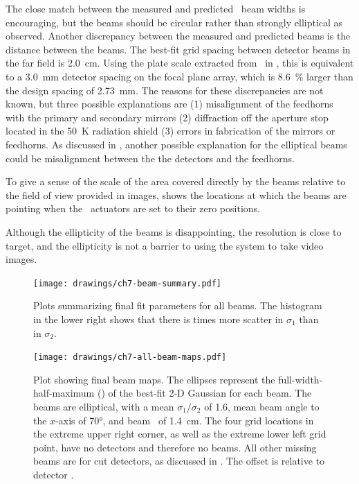 The close match between the measured and predicted \FWHM\ beam widths is encouraging, but the beams should be circular rather than strongly elliptical as observed.
Another discrepancy between the measured and predicted beams is the distance between the beams.
The best-fit grid spacing between detector beams in the far field is \SI{2.0}{\cm}.
Using the plate scale extracted from \ZEMAX\ in , this is equivalent to a \SI{3.0}{\mm} detector spacing on the focal plane array, which is \SI{8.6}{\percent} larger than the design spacing of \SI{2.73}{\mm}.
The reasons for these discrepancies are not known, but three possible explanations are (1) misalignment of the feedhorns with the primary and secondary mirrors (2) diffraction off the aperture stop located in the \SI{50}{\kelvin} radiation shield (3) errors in fabrication of the mirrors or feedhorns.
As discussed in , another possible explanation for the elliptical beams could be misalignment between the the detectors and the feedhorns.

To give a sense of the scale of the area covered directly by the beams relative to the field of view provided in images,  shows the locations at which the beams are pointing when the \BOSE\ actuators are set to their zero positions.

Although the ellipticity of the beams is disappointing, the resolution is close to target, and the ellipticity is not a barrier to using the system to take video images.

\begin{figure}
\centering
\texttt{[image: drawings/ch7-beam-summary.pdf]}
\caption[Beam fit parameters]{
  Plots summarizing final fit parameters for all beams.
  The histogram in the lower right shows that there is  times more scatter in $\sigma_1$ than in $\sigma_2$. 
}
\label{fig:ch7-beam-summary}
\end{figure}

\begin{figure}
\centering
\texttt{[image: drawings/ch7-all-beam-maps.pdf]}
\caption[Beam maps]{
Plot showing final beam maps.
The ellipses represent the full-width-half-maximum (\FWHM) of the best-fit 2-D Gaussian for each beam. The beams are elliptical, with a mean $\sigma_1/\sigma_2$ of 1.6, mean beam angle to the $x$-axis of \ang{70}, and beam \FWHM\ of \SI{1.4}{\cm}.
The four grid locations in the extreme upper right corner, as well as the extreme lower left grid point, have no detectors and therefore no beams. All other missing beams are for cut detectors, as discussed in .
The offset is relative to detector .
}
\label{fig:ch7-all-beam-maps}
\end{figure}


